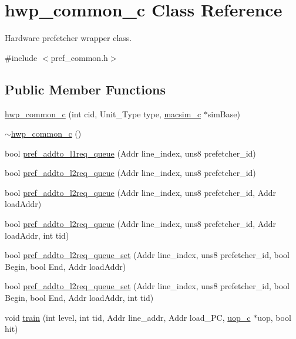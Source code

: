 \hypertarget{classhwp__common__c}{
\section{hwp\_\-common\_\-c Class Reference}
\label{classhwp__common__c}
}


Hardware prefetcher wrapper class.  




{\ttfamily \#include $<$pref\_\-common.h$>$}

\subsection*{Public Member Functions}
\begin{DoxyCompactItemize}
\item 
\hyperlink{classhwp__common__c_a033e4c345dd722dd59224baa20fcf301}{hwp\_\-common\_\-c} (int cid, Unit\_\-Type type, \hyperlink{classmacsim__c}{macsim\_\-c} $\ast$simBase)
\item 
\hyperlink{classhwp__common__c_ae8646bcfac93ad04e980bbafc23bf8cd}{$\sim$hwp\_\-common\_\-c} ()
\item 
bool \hyperlink{classhwp__common__c_a45f9544bf7c9ef26d7838bfae1b05616}{pref\_\-addto\_\-l1req\_\-queue} (Addr line\_\-index, uns8 prefetcher\_\-id)
\item 
bool \hyperlink{classhwp__common__c_a9f4d085287cf2fbf8c21f416d9a1b3eb}{pref\_\-addto\_\-l2req\_\-queue} (Addr line\_\-index, uns8 prefetcher\_\-id)
\item 
bool \hyperlink{classhwp__common__c_a1198b5efe08b9bd745597032e1f84e73}{pref\_\-addto\_\-l2req\_\-queue} (Addr line\_\-index, uns8 prefetcher\_\-id, Addr loadAddr)
\item 
bool \hyperlink{classhwp__common__c_a2fd8e909755f1e1fde9a131d2a2b22dc}{pref\_\-addto\_\-l2req\_\-queue} (Addr line\_\-index, uns8 prefetcher\_\-id, Addr loadAddr, int tid)
\item 
bool \hyperlink{classhwp__common__c_af9bf1e4d7f6cbb02bcdadc99dda4ca6f}{pref\_\-addto\_\-l2req\_\-queue\_\-set} (Addr line\_\-index, uns8 prefetcher\_\-id, bool Begin, bool End, Addr loadAddr)
\item 
bool \hyperlink{classhwp__common__c_a0120eb46d94d9dd9691d215ab38e4597}{pref\_\-addto\_\-l2req\_\-queue\_\-set} (Addr line\_\-index, uns8 prefetcher\_\-id, bool Begin, bool End, Addr loadAddr, int tid)
\item 
void \hyperlink{classhwp__common__c_a957c2371bab5f43e1718b31a044c93f5}{train} (int level, int tid, Addr line\_\-addr, Addr load\_\-PC, \hyperlink{classuop__c}{uop\_\-c} $\ast$uop, bool hit)

\end{DoxyCompactItemize}
